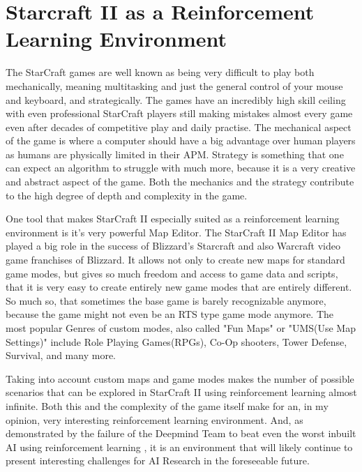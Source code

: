 \section{Starcraft II as a Reinforcement Learning Environment}
The StarCraft games are well known as being very difficult to play both mechanically, meaning multitasking and just the general control of your mouse and keyboard, and strategically. The games have an incredibly high skill ceiling with even professional StarCraft players still making mistakes almost every game even after decades of competitive play and daily practise. The mechanical aspect of the game is where a computer should have a big advantage over human players as humans are physically limited in their APM. Strategy is something that one can expect an algorithm to struggle with much more, because it is a very creative and abstract aspect of the game. Both the mechanics and the strategy contribute to the high degree of  depth and complexity in the game. 

One tool that makes StarCraft II especially suited as a reinforcement learning environment is it's very powerful Map Editor. 
The StarCraft II Map Editor has played a big role in the success of Blizzard's Starcraft and also Warcraft video game franchises of Blizzard. It allows not only to create new maps for standard game modes, but gives so much freedom and access to game data and scripts, that it is very easy to create entirely new game modes that are entirely different. So much so, that sometimes the base game is barely recognizable anymore, because the game might not even be an RTS type game mode anymore. The most popular Genres of custom modes, also called "Fun Maps" or "UMS(Use Map Settings)"
 include Role Playing Games(RPGs), Co-Op shooters, Tower Defense, Survival, and many more.
 
Taking into account custom maps and game modes makes the number of possible scenarios that can be explored in StarCraft II using reinforcement learning almost infinite. Both this and the complexity of the game itself make for an, in my opinion, very interesting reinforcement learning environment. And, as demonstrated by the failure of the Deepmind Team to beat even the worst inbuilt AI using reinforcement learning \citep{DBLP:journals/corr/dmsc2}, it is an environment that will likely continue to present interesting challenges for AI Research in the foreseeable future.
 